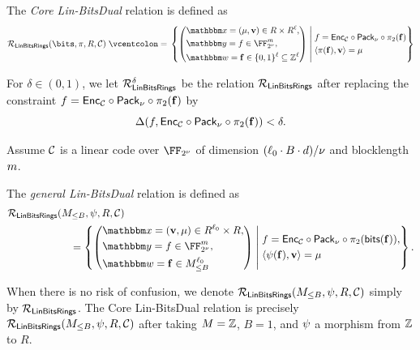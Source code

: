\documentclass[11pt,letterpaper,usenames,dvipsnames]{article}
\begin{document}
\begin{definition} The \emph{Core Lin-BitsDual} relation  is defined as
%
$$
\LinBitsDual(\bits,\pi, R,\cC) \defeq \left\{ \left(\begin{aligned} &\inp=(\mu, \vv)\in R \times R^{\codedim}, \\&\oracle = f \in \comfield^\codelength, \\ &\wit= \bff\in \{0,1\}^\codedim \subseteq \ZZ^\codedim\end{aligned}\right) \;\middle|\;  \begin{aligned} &f=\Enc_{\cC}\circ \pack \circ \picomfield(\bff) \\    & \langle \pi(\bff), \vv\rangle  = \mu  \end{aligned} \right\}
$$
%
\end{definition}
%
%
%
%
For $\delta\in (0,1)$, we let $\mathcal{R}_{\mathsf{LinBitsRings}}^\delta$  be the relation $\mathcal{R}_{\mathsf{LinBitsRings}}$  after replacing the constraint $f=\mathsf{Enc}_{\mathcal{C}}\circ \mathsf{Pack}_\nu\circ\pi_2(\mathbf{f})$ by
%
$$
\Delta(f,\mathsf{Enc}_{\mathcal{C}}\circ \mathsf{Pack}_\nu\circ\pi_2(\mathbf{f}))<\delta.
$$


\renewcommand{\moduleone}{M}
\renewcommand{\moduleonebound}{M_{\leq B}}
\renewcommand{\moduletwo}{R}



Assume $\mathcal{C}$ is a linear code over $\comfield$ of dimension $(\ell_0\cdot B \cdot d)/\nu$ and blocklength $m$. 
\begin{definition} The \emph{general Lin-BitsDual}  relation is defined as
%
\begin{align*}
 &\LinModFieldBin(\moduleonebound,\modulemorphism,R,  \cC)\\ &\qquad\qquad\qquad= \left\{ \left(\begin{aligned} &\inp=(\vv,\mu)\in R^{ \codedim_0}  \times R, \\
 &\oracle = f \in \comfield^{\codelength}, \\ &\wit= \bff\in \moduleonebound^{\codedim_0}\end{aligned}\right) \;\middle|\;  \begin{aligned}  
 &f = \Enc_{\cC}\circ \pack\circ\pi_2(\mathsf{bits}(\bff)),\\
 &\langle \modulemorphism(\bff), \vv \rangle = \mu 
 \end{aligned} \right\}.
\end{align*}
\end{definition}
%
When there is no risk of confusion, we denote $\LinModFieldBin(\moduleonebound,\modulemorphism,\moduletwo,  \cC)$ simply by $\mathcal{R}_{\mathsf{LinBitsRings}}$. The Core Lin-BitsDual relation is precisely $\LinModFieldBin(\moduleonebound,\modulemorphism,\moduletwo,  \cC)$ after taking $\moduleone=\ZZ$, $B=1$, and $\psi$ a morphism from $\mathbb{Z}$ to $R$. %
\end{document}
